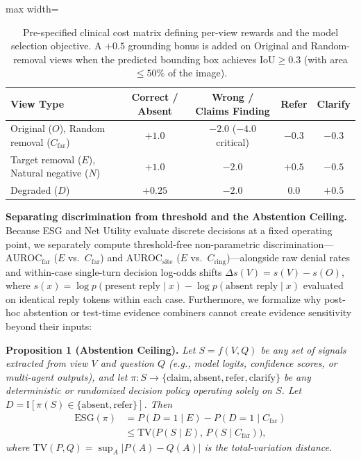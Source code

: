 \documentclass[5p,times,twocolumn,authoryear]{elsarticle}
\begin{document}
\begin{table}[!t]
\caption{Pre-specified clinical cost matrix defining per-view rewards and the model selection objective. A $+0.5$ grounding bonus is added on Original and Random-removal views when the predicted bounding box achieves $\text{IoU} \ge 0.3$ (with area $\le 50\%$ of the image).}
\label{tab:cost_matrix}
\vspace{-0.2cm}
\begin{center}
\small
\begin{adjustbox}{max width=\linewidth}
\begin{tabular}{lcccc}
\toprule
\textbf{View Type} & \textbf{Correct / Absent} & \textbf{Wrong / Claims Finding} & \textbf{Refer} & \textbf{Clarify} \\
\midrule
Original ($O$), Random removal ($C_{\text{far}}$) & $+1.0$ & $-2.0$ ($-4.0$ critical) & $-0.3$ & $-0.3$ \\
Target removal ($E$), Natural negative ($N$) & $+1.0$ & $-2.0$ & $+0.5$ & $-0.5$ \\
Degraded ($D$) & $+0.25$ & $-2.0$ & $0.0$ & $+0.5$ \\
\bottomrule
\end{tabular}
\end{adjustbox}
\end{center}
\vspace{-0.2cm}
\end{table}

\textbf{Separating discrimination from threshold and the Abstention Ceiling.} Because ESG and Net Utility evaluate discrete decisions at a fixed operating point, we separately compute threshold-free non-parametric discrimination---$\text{AUROC}_{\text{far}}$ ($E$ vs.\ $C_{\text{far}}$) and $\text{AUROC}_{\text{site}}$ ($E$ vs.\ $C_{\text{ring}}$)---alongside raw denial rates and within-case single-turn decision log-odds shifts $\Delta s(V) = s(V) - s(O)$, where $s(x) = \log p(\text{present reply} \mid x) - \log p(\text{absent reply} \mid x)$ evaluated on identical reply tokens within each case. Furthermore, we formalize why post-hoc abstention or test-time evidence combiners cannot create evidence sensitivity beyond their inputs:

\textbf{Proposition 1 (Abstention Ceiling).} \emph{Let $S = f(V, Q)$ be any set of signals extracted from view $V$ and question $Q$ (e.g., model logits, confidence scores, or multi-agent outputs), and let $\pi: S \to \{\text{claim}, \text{absent}, \text{refer}, \text{clarify}\}$ be any deterministic or randomized decision policy operating solely on $S$. Let $D = \mathbb{I}[\pi(S) \in \{\text{absent}, \text{refer}\}]$. Then}
\begin{equation}
\label{eq:abstention_ceiling}
\begin{split}
\text{ESG}(\pi) &= P(D = 1 \mid E) - P(D = 1 \mid C_{\text{far}})\\
&\le \text{TV}\big(P(S \mid E),\, P(S \mid C_{\text{far}})\big),
\end{split}
\end{equation}
\emph{where $\text{TV}(P, Q) = \sup_{A} |P(A) - Q(A)|$ is the total-variation distance.}
\end{document}

